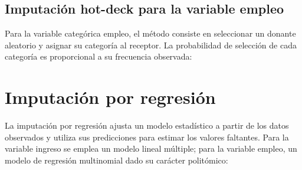 \documentclass[
  spanish,
  12pt,
]{book}
\newenvironment{Shaded}{\begin{snugshade}}{\end{snugshade}}
\newcommand{\AttributeTok}[1]{\textcolor[rgb]{0.13,0.29,0.53}{#1}}
\newcommand{\ConstantTok}[1]{\textcolor[rgb]{0.56,0.35,0.01}{#1}}
\newcommand{\DecValTok}[1]{\textcolor[rgb]{0.00,0.00,0.81}{#1}}
\newcommand{\FunctionTok}[1]{\textcolor[rgb]{0.13,0.29,0.53}{\textbf{#1}}}
\newcommand{\NormalTok}[1]{#1}
\newcommand{\OtherTok}[1]{\textcolor[rgb]{0.56,0.35,0.01}{#1}}
\newcommand{\SpecialCharTok}[1]{\textcolor[rgb]{0.81,0.36,0.00}{\textbf{#1}}}
\newcommand{\StringTok}[1]{\textcolor[rgb]{0.31,0.60,0.02}{#1}}
\begin{document}
\subsection{Imputación hot-deck para la variable empleo}\label{imputaciuxf3n-hot-deck-para-la-variable-empleo}

Para la variable categórica empleo, el método consiste en seleccionar un donante aleatorio y asignar su categoría al receptor. La probabilidad de selección de cada categoría es proporcional a su frecuencia observada:

\begin{Shaded}
\end{Shaded}

\section{Imputación por regresión}\label{sec-regresion}

La imputación por regresión ajusta un modelo estadístico a partir de los datos observados y utiliza sus predicciones para estimar los valores faltantes. Para la variable ingreso se emplea un modelo lineal múltiple; para la variable empleo, un modelo de regresión multinomial dado su carácter politómico:
\end{document}
